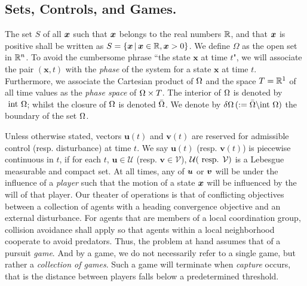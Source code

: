 \subsection{Sets, Controls, and Games.}
%
\noindent The set $S$ of all $\bm{x}$ such that $\bm{x}$ belongs to the real numbers  $\mathbb{R}$, and that $\bm{x}$ is positive shall be written as $S=\{\bm{x}\,|\, \bm{x} \in \mathbb{R}, \bm{x} >0\}$. We define $\Omega$ as the open set in $\mathbb{R}^n$.  To avoid the cumbersome phrase ``the state $\bm{x}$ at time $t$", we will associate the pair $(\bm{x}, t)$ with the \textit{phase} of the system for a state $\bm{x}$ at time $t$. Furthermore, we associate the Cartesian product of $\Omega$ and the space $T =\mathbb{R}^1$ of all time values as the \textit{phase space} of $\Omega \times T$. The interior of $\Omega$ is denoted by $\text{ int } \Omega$; whilst the closure of $\Omega$ is denoted $\bar{\Omega}$. We denote by $\delta \Omega \,(:= \bar{\Omega} \backslash \text{int } \Omega)$ the boundary of the set $\Omega$. 

Unless otherwise stated, vectors $\bm{u}(t)$ and $\bm{v}(t)$ are reserved for admissible control (resp. disturbance) at time $t$. We say $\bm{u}(t)$ (resp. $\bm{v}(t)$) is piecewise continuous in $t$, if for each $t$, $\bm{u} \in \mathcal{U}$ (resp. $\bm{v} \in \mathcal{V}$), $\mathcal{U}(\text{ resp. } \mathcal{V})$ is a Lebesgue measurable and compact set. At all times, any of $\bm{u}$ or $\bm{v}$ will be under the influence of a \textit{player} such that the motion of a state $\bm{x}$ will be influenced by the will of that player. Our theater of operations is that of conflicting objectives between a collection of agents with a heading convergence objective and an external disturbance. For agents that are members of a local coordination group, collision avoidance shall apply so that  agents within a local neighborhood cooperate to avoid predators. Thus, the problem at hand assumes that of a pursuit \textit{game}.  And by a game, we do not necessarily refer to a single game, but rather a \textit{collection of games}. Such a game will terminate when \textit{capture} occurs, that is the distance between players falls below a predetermined threshold. 

